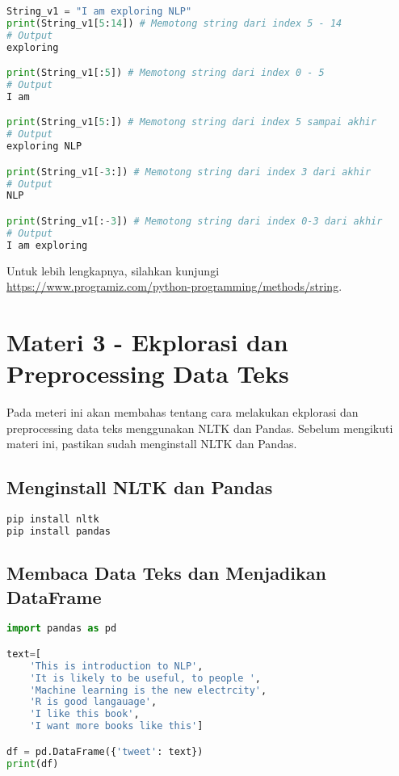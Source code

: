 \documentclass{article}
\begin{document}
    \begin{lstlisting}[language=python, style=pythonstyle]
String_v1 = "I am exploring NLP"
print(String_v1[5:14]) # Memotong string dari index 5 - 14
# Output
exploring

print(String_v1[:5]) # Memotong string dari index 0 - 5
# Output
I am

print(String_v1[5:]) # Memotong string dari index 5 sampai akhir
# Output
exploring NLP

print(String_v1[-3:]) # Memotong string dari index 3 dari akhir
# Output
NLP

print(String_v1[:-3]) # Memotong string dari index 0-3 dari akhir
# Output
I am exploring
    \end{lstlisting}

    \begin{flushleft}
        Untuk lebih lengkapnya, silahkan kunjungi \\
    \href{https://www.programiz.com/python-programming/methods/string}{https://www.programiz.com/python-programming/methods/string}.
    \end{flushleft}

    \section*{Materi 3 \@- Ekplorasi dan Preprocessing Data Teks}

    Pada meteri ini akan membahas tentang cara melakukan ekplorasi dan preprocessing data teks menggunakan NLTK dan Pandas.
    Sebelum mengikuti materi ini, pastikan sudah menginstall NLTK dan Pandas.

    \subsection*{Menginstall NLTK dan Pandas}

    \begin{lstlisting}[language=bash, style=bashstyle]
pip install nltk
pip install pandas
    \end{lstlisting}

    \subsection*{Membaca Data Teks dan Menjadikan DataFrame}

    \begin{lstlisting}[language=python, style=pythonstyle]
import pandas as pd

text=[
    'This is introduction to NLP',
    'It is likely to be useful, to people ',
    'Machine learning is the new electrcity', 
    'R is good langauage', 
    'I like this book',
    'I want more books like this']

df = pd.DataFrame({'tweet': text})   
print(df)
    \end{lstlisting}
\end{document}
